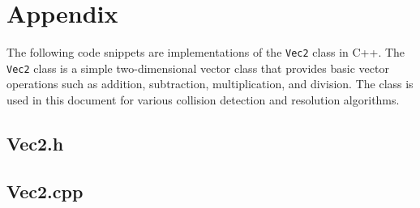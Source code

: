 
\section*{Appendix}

The following code snippets are implementations of the \texttt{Vec2} class in
C++. The \texttt{Vec2} class is a simple two-dimensional vector class that
provides basic vector operations such as addition, subtraction, multiplication,
and division. The class is used in this document for various collision
detection and resolution algorithms.

\subsection*{Vec2.h}
\vspace{1em}
\begin{mdframed}[linecolor=black!30!white,linewidth=.5pt,extratopheight=1em]
    
\end{mdframed}

\subsection*{Vec2.cpp}
\vspace{1em}
\begin{mdframed}[linecolor=black!30!white,linewidth=.5pt,extratopheight=1em]
    
\end{mdframed}